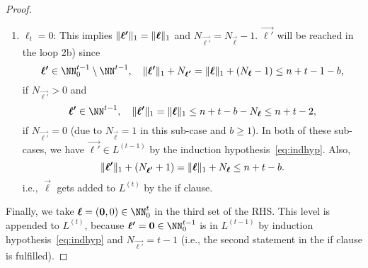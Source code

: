 \begin{proof}
\begin{enumerate}
    \item
    $\ell_t = 0$:
    This implies
    $\lVert{{\boldsymbol{\ell'}}}\rVert_1 = \lVert{{\boldsymbol{\ell}}}\rVert_1$ and
    $N_{\vec{\ell'}} = N_{\vec{\ell}} - 1$.
    $\vec{\ell'}$ will be reached in the loop 2b) since
    \begin{equation*}
    \vec{\ell'} \in \NN_0^{t-1} \setminus \NN^{t-1},\quad
    \norm{\vec{\ell'}}_1 + N_{\vec{\ell'}}
    = \norm{\vec{\ell}}_1 + (N_{\vec{\ell}} - 1)
    \le n + t - 1 - b,
    \end{equation*}
    if $N_{\vec{\ell'}} > 0$ and
    \begin{equation*}
    \vec{\ell'} \in \NN^{t-1},\quad
    \norm{\vec{\ell'}}_1
    = \norm{\vec{\ell}}_1
    \le n + t - b - N_{\vec{\ell}}
    \le n + t - 2,
    \end{equation*}
    if $N_{\vec{\ell'}} = 0$
    (due to $N_{\vec{\ell}} = 1$ in this sub-case and $b \ge 1$).
    In both of these sub-cases,
    we have $\vec{\ell'} \in L^{(t-1)}$ by the induction
    hypothesis~\eqref{eq:indhyp}. Also,
    \begin{equation*}
    \lVert{{\boldsymbol{\ell'}}}\rVert_1 + (N_{{\boldsymbol{\ell'}}} + 1)
    = \lVert{{\boldsymbol{\ell}}}\rVert_1 + N_{{\boldsymbol{\ell}}}
    \le n + t - b.
    \end{equation*}
    i.e., $\vec{\ell}$ gets added to $L^{(t)}$
    by the if clause.
  \end{enumerate}
  
  Finally, we take $\vec{\ell} = (\vec{0}, 0) \in \NN_0^t$
  in the third set of the RHS.
  This level is appended to $L^{(t)}$, because
  $\vec{\ell'} = \vec{0} \in \NN_0^{t-1}$ is in $L^{(t-1)}$ by 
  induction hypothesis~\eqref{eq:indhyp} and $N_{\vec{\ell'}} = t - 1$
  (i.e., the second statement in the if clause is fulfilled).
\end{proof}
